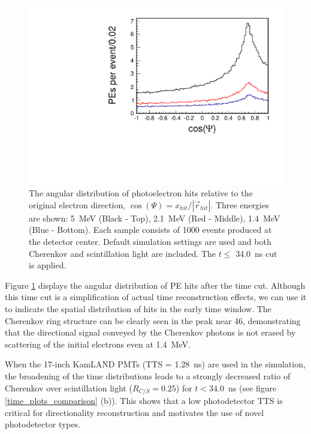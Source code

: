 \documentclass[cits]{JINST}
\begin{document}
\begin{figure}
        \begin{center}
        \includegraphics[scale=0.40]{graphs2/combination_cos_psi_34_h.pdf}
        \caption[]{The angular distribution of photoelectron hits
        relative to the original electron direction, $\cos(\Psi) =
        x_{hit}/|\vec{r}_{hit}|$. Three energies are shown: 5~MeV (Black - Top), 2.1~MeV (Red - Middle), 1.4~MeV (Blue - Bottom). Each sample consists of 1000 events produced at the detector center. Default
        simulation settings are used and both Cherenkov and
        scintillation light are included. The $t\leq$ 34.0~ns cut is applied.} 
        \label{Cherenkov_cone}
        \end{center}
\end{figure}

Figure \ref{Cherenkov_cone} displays the angular distribution of PE
hits after the time cut. Although this time cut is a simplification of actual time
reconstruction effects, we can use it to indicate the spatial
distribution of hits in the early time window. The Cherenkov ring structure
can be clearly seen in the peak near 46\textdegree, demonstrating
that the directional signal conveyed by the Cherenkov photons is not
erased by scattering of the initial electrons even at 1.4~MeV.

When the 17-inch KamLAND PMTs\cite{tajimaMaster,kume_1983} (TTS =
1.28~ns) are used in the simulation, the broadening of the time
distributions leads to a strongly decreased ratio of Cherenkov over
scintillation light ($R_{C/S}=0.25$) for $t<34.0$~ns (see
figure \ref{time_plots_comparison} (b)). This shows that a low
photodetector TTS is critical for directionality reconstruction and
motivates the use of novel photodetector types.
\end{document}
